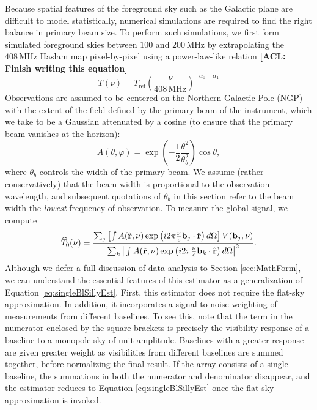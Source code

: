 \documentclass[twocolumn,apj,numberedappendix]{emulateapj}
\newcommand{\rhat}{\hat{\mathbf{r}}}
\newcommand{\acl}[1]{{\color{red} \textbf{[ACL:  #1]}}}
\begin{document}
Because spatial features of the foreground sky such as the Galactic plane are difficult to model statistically, numerical simulations are required to find the right balance in primary beam size. To perform such simulations, we first form simulated foreground skies between $100$ and $200\,\textrm{MHz}$ by extrapolating the $408\,\textrm{MHz}$ Haslam map \citep{Haslam_408MHz_map} pixel-by-pixel using a power-law-like relation \acl{Finish writing this equation}
\begin{equation}
\label{sec:HaslamExtrap}
T(\nu) = T_\textrm{ref} \left( \frac{\nu}{408\,\textrm{MHz}}\right)^{-\alpha_0 - \alpha_1 }
\end{equation}
Observations are assumed to be centered on the Northern Galactic Pole (NGP) with the extent of the field defined by the primary beam of the instrument, which we take to be a Gaussian attenuated by a cosine (to ensure that the primary beam vanishes at the horizon):
\begin{equation}
\label{eq:TaperedGauss}
A(\theta, \varphi) = \exp \left( -\frac{1}{2} \frac{\theta^2}{\theta_b^2} \right) \cos \theta,
\end{equation}
where $\theta_b$ controls the width of the primary beam. We assume (rather conservatively) that the beam width is proportional to the observation wavelength, and subsequent quotations of $\theta_b$ in this section refer to the beam width the \emph{lowest} frequency of observation. To measure the global signal, we compute
\begin{equation}
\label{eq:NormedSimpleEst}
\widehat{T}_0 (\nu) = \frac{ \sum_j \left[ \int  A(\rhat, \nu) \exp\left(i 2\pi \frac{\nu }{c}\mathbf{b}_j \cdot \rhat \right)d\Omega \right] V(\mathbf{b}_j, \nu)}{ \sum_k \big{|} \int  A(\rhat, \nu) \exp\left(i 2\pi \frac{\nu }{c}\mathbf{b}_k \cdot \rhat \right)d\Omega \big{|}^2}.
\end{equation}
Although we defer a full discussion of data analysis to Section \ref{sec:MathForm}, we can understand the essential features of this estimator as a generalization of Equation \eqref{eq:singleBlSillyEst}. First, this estimator does not require the flat-sky approximation. In addition, it incorporates a signal-to-noise weighting of measurements from different baselines. To see this, note that the term in the numerator enclosed by the square brackets is precisely the visibility response of a baseline to a monopole sky of unit amplitude. Baselines with a greater response are given greater weight as visibilities from different baselines are summed together, before normalizing the final result. If the array consists of a single baseline, the summations in both the numerator and denominator disappear, and the estimator reduces to Equation \eqref{eq:singleBlSillyEst} once the flat-sky approximation is invoked.
\end{document}
